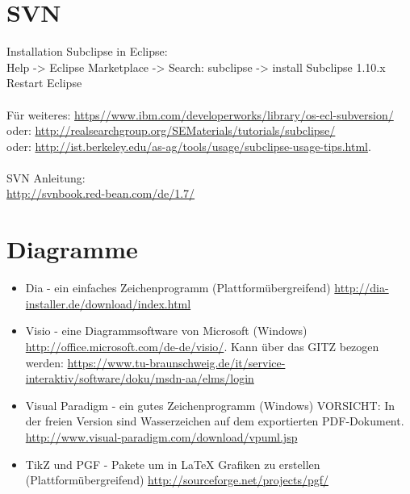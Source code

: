 \section{SVN}

Installation Subclipse in Eclipse:\\
Help -> Eclipse Marketplace -> Search: subclipse -> install Subclipse 1.10.x
Restart Eclipse\\
\\
Für weiteres: \url{https//www.ibm.com/developerworks/library/os-ecl-subversion/}\\
oder: \url{http://realsearchgroup.org/SEMaterials/tutorials/subclipse/}\\
oder: \url{http://ist.berkeley.edu/as-ag/tools/usage/subclipse-usage-tips.html}.\\
\\
SVN Anleitung:\\
\url{http://svnbook.red-bean.com/de/1.7/}

\section{Diagramme}


\begin{itemize}
    \item Dia - ein einfaches Zeichenprogramm (Plattformübergreifend) \url{http://dia-installer.de/download/index.html}
    \item Visio - eine Diagrammsoftware von Microsoft (Windows)  \url{http://office.microsoft.com/de-de/visio/}. Kann über das GITZ bezogen werden: \url{https://www.tu-braunschweig.de/it/service-interaktiv/software/doku/msdn-aa/elms/login}
    \item Visual Paradigm - ein gutes Zeichenprogramm (Windows) VORSICHT: In der freien Version sind Wasserzeichen auf dem exportierten PDF-Dokument. \url{http://www.visual-paradigm.com/download/vpuml.jsp}
    \item TikZ und PGF - Pakete um in LaTeX Grafiken zu erstellen (Plattformübergreifend) \url{http://sourceforge.net/projects/pgf/}
\end{itemize}






